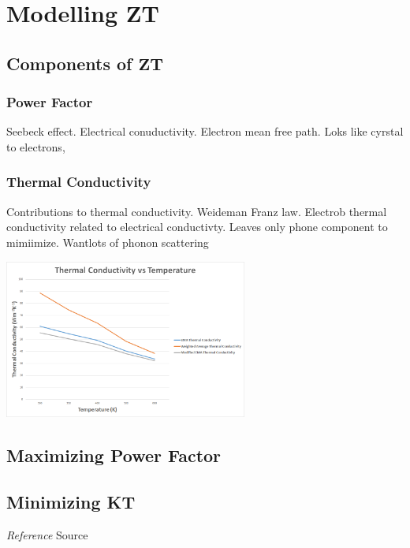 \documentclass[twocolumn]{article}
\begin{document}
\section{Modelling $\mathbf{ZT}$ }
\label{sec:Modelling ZT}

\subsection{Components of $\mathbf{ZT}$}
\label{sec:Components of ZT}

\subsubsection{Power Factor}
\label{sec:Power Factor}
Seebeck effect. Electrical conuductivity. Electron mean free path. Loks like cyrstal to electrons,


\subsubsection{Thermal Conductivity}
\label{sec:Thermal Conductivity}
Contributions to thermal conductivity. Weideman Franz law. Electrob thermal conductivity related to electrical conductivty. Leaves only phone component to mimiimize. Wantlots of phonon scattering

\includegraphics[width=80mm]{kphvstempAM.png}

\subsection{Maximizing Power Factor}
\label{sec:Maximizing Power Factor}


\subsection{Minimizing KT}
\label{sec:Minimizing KT}

\newpage
\begin{thebibliography}{9}
 \emph{Reference} Source
\end{thebibliography}
\end{document}
